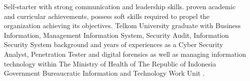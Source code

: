 %
%
%
\par{
Self-starter with strong communication and leadership skills. proven academic and curricular achievements, possess soft skills required to propel the organization achieving its objectives. Telkom University graduate with Business Information, Management Information System, Security Audit, Information Security System background and years of experiences as a Cyber Security Analyst, Penetration Tester and digital forensics as well as managing information technology within The Ministry of Health of The Republic of Indonesia Government Bureaucratic Information and Technology Work Unit .
}